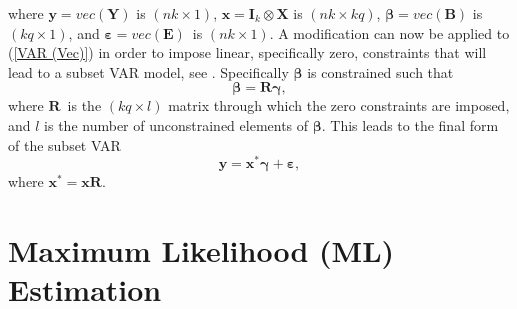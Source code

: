 where $\mathbf{y}=vec\left(\mathbf{Y}\right)$ is $\left(nk\times1\right)$,
$\mathbf{x}=\mathbf{I}_{k}\otimes\mathbf{X}$ is $\left(nk\times kq\right)$,
$\mathbf{\beta}=vec\left(\mathbf{B}\right)$ is $\left(kq\times1\right)$,
and $\mathbf{\varepsilon}=vec\left(\mathbf{E}\right)$\ is $\left(nk\times1\right)$.
A modification can now be applied to (\ref{VAR (Vec)}) in order to
impose linear, specifically zero, constraints that will lead to a
subset VAR model, see \citet[Chap.~5.2]{Luetk:1993}. Specifically
$\mathbf{\beta}$ is constrained such that
\begin{equation}
\mathbf{\beta}=\mathbf{R\gamma},\label{Constrained Beta}
\end{equation}
where $\mathbf{R}$\ is the $\left(kq\times l\right)$ matrix through
which the zero constraints are imposed, and $l$ is the number of
unconstrained elements of $\mathbf{\beta}$. This leads to the final
form of the subset VAR
\begin{equation}
\mathbf{y}=\mathbf{x}^{\ast}\mathbf{\gamma}+\mathbf{\varepsilon},\label{Subset VAR (Vec)}
\end{equation}
where $\mathbf{x}^{\ast}=\mathbf{xR}$.


\section{Maximum Likelihood (ML) Estimation}

